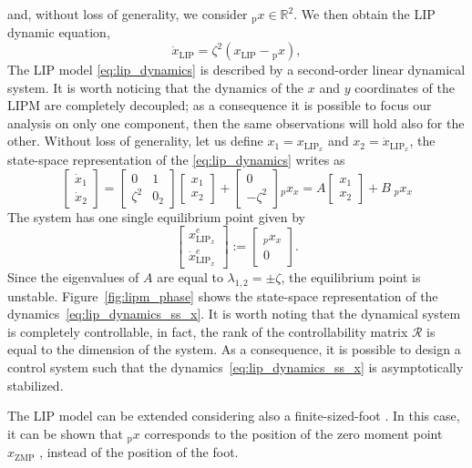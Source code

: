 and, without loss of generality, we consider ${}_\text{p}x \in \mathbb{R}^2$. We then obtain the LIP dynamic equation,
\begin{equation}\label{eq:lip_dynamics}
	\ddot{x}_\text{LIP} = \zeta^2\left(x_\text{LIP} - {}_\text{p}x\right),
\end{equation} 
The LIP model \eqref{eq:lip_dynamics} is described by a second-order linear dynamical system. It is worth noticing that the dynamics of the $x$ and $y$ coordinates of the LIPM are completely decoupled; as a consequence it is possible to focus our analysis on only one component, then the same observations will hold also for the other. 
Without loss of generality, let us define $x_1 = x_{\text{LIP}_x}$ and $x_2 = \dot{x}_{\text{LIP}_x}$, the state-space representation of the \eqref{eq:lip_dynamics} writes as
\begin{equation}
\label{eq:lip_dynamics_ss_x}
    \begin{bmatrix}
    \dot{x}_1 \\
     \dot{x}_2 
    \end{bmatrix}
    = 
         \begin{bmatrix}
    0 & 1 \\
    \zeta^2 & 0_2
    \end{bmatrix}
        \begin{bmatrix}
    x_1 \\
     x_2 
    \end{bmatrix} + 
    \begin{bmatrix}
    0 \\
    -\zeta^2
    \end{bmatrix}
{}_px_x = A     \begin{bmatrix}
    x_1 \\
     x_2 
    \end{bmatrix} + 
    B \; {}_px_x
\end{equation} 
The system has one single equilibrium point given by 
\begin{equation}
    \begin{bmatrix}
    {x}_{\text{LIP}_x}^e\\
	{\dot{x}}_{\text{LIP}_x}^e
	\end{bmatrix}
	 := \begin{bmatrix}
	    {}_px_x\\
	 	0
	 \end{bmatrix}.
\end{equation}
Since the eigenvalues of $A$ are equal to $\lambda_{1,2} =  \pm \zeta$, the equilibrium point is unstable. Figure~\ref{fig:lipm_phase} shows the state-space representation of the dynamics~\eqref{eq:lip_dynamics_ss_x}. 
It is worth noting that the dynamical system is completely controllable, in fact, the rank of the controllability matrix $\mathcal{R}$ is equal to the dimension of the system. As a consequence, it is possible to design a control system such that the dynamics~\eqref{eq:lip_dynamics_ss_x} is asymptotically stabilized. 
\par
The LIP model can be extended considering also a finite-sized-foot \citep{Kajita2001,koolen2012capturability}. In this case, it can be shown that ${}_\text{p}x$ corresponds to the position of the zero moment point $x_\text{ZMP}$ \citep{vukobratovic2004zero}, instead of the position of the foot.